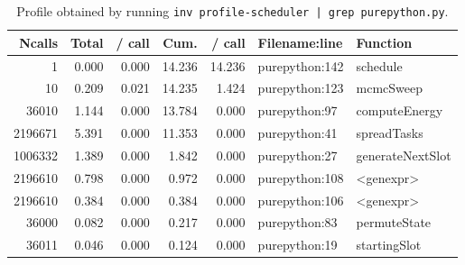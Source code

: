 \begin{table}[H]
  \centering
  \caption{Profile obtained by running \texttt{inv profile-scheduler | grep purepython.py}.}
  \begin{tabular}{rrrrrll}
    \hline
    \bf Ncalls & \bf Total & \bf / call & \bf Cum. & \bf / call & \bf Filename:line & \bf Function     \\
    \hline
    1          & 0.000     & 0.000      & 14.236   & 14.236     & purepython:142    & schedule         \\
    10         & 0.209     & 0.021      & 14.235   & 1.424      & purepython:123    & mcmcSweep        \\
    36010      & 1.144     & 0.000      & 13.784   & 0.000      & purepython:97     & computeEnergy    \\
    2196671    & 5.391     & 0.000      & 11.353   & 0.000      & purepython:41     & spreadTasks      \\
    1006332    & 1.389     & 0.000      & 1.842    & 0.000      & purepython:27     & generateNextSlot \\
    2196610    & 0.798     & 0.000      & 0.972    & 0.000      & purepython:108    & <genexpr>        \\
    2196610    & 0.384     & 0.000      & 0.384    & 0.000      & purepython:106    & <genexpr>        \\
    36000      & 0.082     & 0.000      & 0.217    & 0.000      & purepython:83     & permuteState     \\
    36011      & 0.046     & 0.000      & 0.124    & 0.000      & purepython:19     & startingSlot     \\
  \end{tabular}
\end{table}
